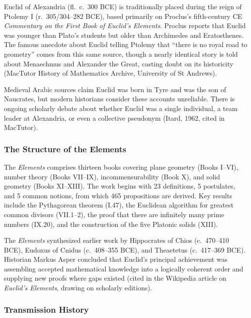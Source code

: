 \documentclass[11pt,letterpaper]{article}
\begin{document}
Euclid of Alexandria (fl.\ c.\ 300 BCE) is traditionally placed during the reign of Ptolemy I (r.\ 305/304--282 BCE), based primarily on Proclus's fifth-century CE \textit{Commentary on the First Book of Euclid's Elements}. Proclus reports that Euclid was younger than Plato's students but older than Archimedes and Eratosthenes. The famous anecdote about Euclid telling Ptolemy that ``there is no royal road to geometry'' comes from this same source, though a nearly identical story is told about Menaechmus and Alexander the Great, casting doubt on its historicity (MacTutor History of Mathematics Archive, University of St Andrews).

Medieval Arabic sources claim Euclid was born in Tyre and was the son of Naucrates, but modern historians consider these accounts unreliable. There is ongoing scholarly debate about whether Euclid was a single individual, a team leader at Alexandria, or even a collective pseudonym (Itard, 1962, cited in MacTutor).

\subsubsection{The Structure of the Elements}

The \textit{Elements} comprises thirteen books covering plane geometry (Books I--VI), number theory (Books VII--IX), incommensurability (Book X), and solid geometry (Books XI--XIII). The work begins with 23 definitions, 5 postulates, and 5 common notions, from which 465 propositions are derived. Key results include the Pythagorean theorem (I.47), the Euclidean algorithm for greatest common divisors (VII.1--2), the proof that there are infinitely many prime numbers (IX.20), and the construction of the five Platonic solids (XIII).

The \textit{Elements} synthesized earlier work by Hippocrates of Chios (c.\ 470--410 BCE), Eudoxus of Cnidus (c.\ 408--355 BCE), and Theaetetus (c.\ 417--369 BCE). Historian Markus Asper concluded that Euclid's principal achievement was assembling accepted mathematical knowledge into a logically coherent order and supplying new proofs where gaps existed (cited in the Wikipedia article on \textit{Euclid's Elements}, drawing on scholarly editions).

\subsubsection{Transmission History}
\end{document}
